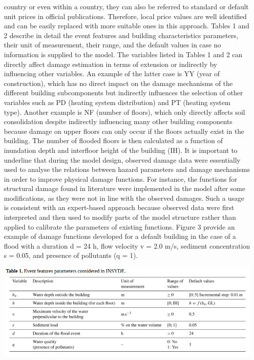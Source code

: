 \documentclass[gc, manuscript]{copernicus}
\begin{document}
country or even within a country, they can also be referred to standard
or default unit prices in official publications. Therefore, local price
values are well identified and can be easily replaced with more suitable
ones in this approach. Tables 1 and 2 describe in detail the event
features and building characteristics parameters, their unit of
measurement, their range, and the default values in case no information
is supplied to the model. The variables listed in Tables 1 and 2 can
directly affect damage estimation in terms of extension or indirectly by
influencing other variables. An example of the latter case is YY (year
of construction), which has no direct impact on the damage mechanisms of
the different building subcomponents but indirectly influences the
selection of other variables such as PD (heating system distribution)
and PT (heating system type). Another example is NF (number of floors),
which only directly affects soil consolidation despite indirectly
influencing many other building components because damage on upper
floors can only occur if the floors actually exist in the building. The
number of flooded floors is then calculated as a function of inundation
depth and interfloor height of the building (IH). It is important to
underline that during the model design, observed damage data were
essentially used to analyse the relations between hazard parameters and
damage mechanisms in order to improve physical damage functions. For
instance, the functions for structural damage found in literature were
implemented in the model after some modifications, as they were not in
line with the observed damages. Such a usage is consistent with an
expert-based approach because observed data were first interpreted and
then used to modify parts of the model structure rather than applied to
calibrate the parameters of existing functions. Figure 3 provide an
example of damage functions developed for a default building in the case
of a flood with a duration d = 24 h, flow velocity v = 2.0 m/s, sediment
concentration s = 0.05, and presence of pollutants (q = 1).

\includegraphics[width=16cm]{table1}
\end{document}
